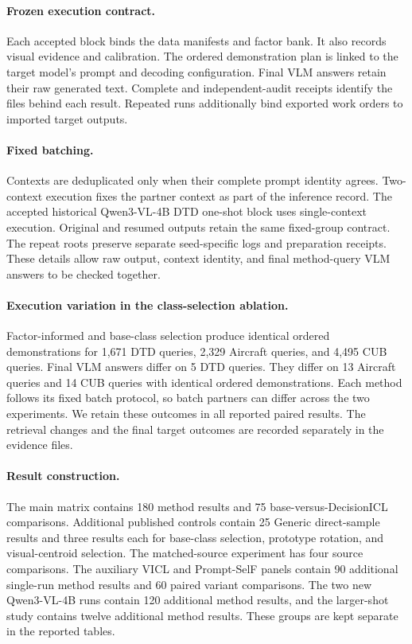 \documentclass[10pt,twocolumn,letterpaper]{article}
\begin{document}
\paragraph{Frozen execution contract.}
Each accepted block binds the data manifests and factor bank. It also records visual evidence and calibration. The ordered demonstration plan is linked to the target model's prompt and decoding configuration. Final VLM answers retain their raw generated text. Complete and independent-audit receipts identify the files behind each result. Repeated runs additionally bind exported work orders to imported target outputs.

\paragraph{Fixed batching.}
Contexts are deduplicated only when their complete prompt identity agrees. Two-context execution fixes the partner context as part of the inference record. The accepted historical Qwen3-VL-4B DTD one-shot block uses single-context execution. Original and resumed outputs retain the same fixed-group contract. The repeat roots preserve separate seed-specific logs and preparation receipts. These details allow raw output, context identity, and final method-query VLM answers to be checked together.

\paragraph{Execution variation in the class-selection ablation.}
Factor-informed and base-class selection produce identical ordered demonstrations for 1,671 DTD queries, 2,329 Aircraft queries, and 4,495 CUB queries. Final VLM answers differ on 5 DTD queries. They differ on 13 Aircraft queries and 14 CUB queries with identical ordered demonstrations. Each method follows its fixed batch protocol, so batch partners can differ across the two experiments. We retain these outcomes in all reported paired results. The retrieval changes and the final target outcomes are recorded separately in the evidence files.

\paragraph{Result construction.}
The main matrix contains 180 method results and 75 base-versus-DecisionICL comparisons. Additional published controls contain 25 Generic direct-sample results and three results each for base-class selection, prototype rotation, and visual-centroid selection. The matched-source experiment has four source comparisons. The auxiliary VICL and Prompt-SelF panels contain 90 additional single-run method results and 60 paired variant comparisons. The two new Qwen3-VL-4B runs contain 120 additional method results, and the larger-shot study contains twelve additional method results. These groups are kept separate in the reported tables.
\end{document}
